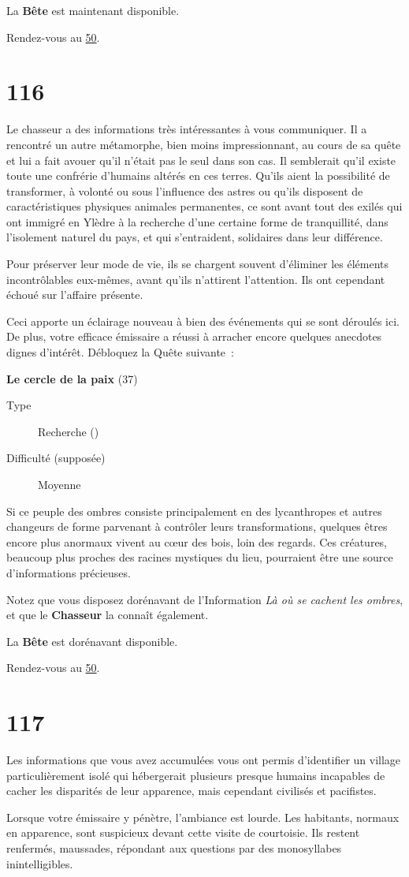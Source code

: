\documentclass{report}
\newcommand{\gsection}[1]{
    \section{#1}
    \label{section-#1}
}
\newcommand{\glink}[1]{\hyperref[section-#1]{#1}}
\newcommand{\quest}[5]{
    \begin{mdframed}[innertopmargin=0.5cm,innerbottommargin=0.5cm,leftmargin=0.5cm,rightmargin=0.5cm]
        \begin{center}
            \textbf{#1} (#2)
        \end{center}
        \begin{description}
            \item[Type] #3
            \item[Difficulté (supposée)] #4
        \end{description}
        #5
    \end{mdframed}
}
\newcommand{\hero}[1]{\textbf{#1}}
\begin{document}
La \hero{Bête} est maintenant disponible.

Rendez-vous au \glink{50}.

\gsection{116}

Le chasseur a des informations très intéressantes à vous communiquer. Il a rencontré un autre métamorphe, bien moins impressionnant, au cours de sa quête et lui a fait avouer qu'il n'était pas le seul dans son cas. Il semblerait qu'il existe toute une confrérie d'humains altérés en ces terres. Qu'ils aient la possibilité de transformer, à volonté ou sous l'influence des astres ou qu'ils disposent de caractéristiques physiques animales permanentes, ce sont avant tout des exilés qui ont immigré en Ylèdre à la recherche d'une certaine forme de tranquillité, dans l'isolement naturel du pays, et qui s'entraident, solidaires dans leur différence. 

Pour préserver leur mode de vie, ils se chargent souvent d'éliminer les éléments incontrôlables eux-mêmes, avant qu'ils n'attirent l'attention. Ils ont cependant échoué sur l'affaire présente. 

Ceci apporte un éclairage nouveau à bien des événements qui se sont déroulés ici. De plus, votre efficace émissaire a réussi à arracher encore quelques anecdotes dignes d'intérêt. Débloquez la Quête suivante : 

\quest{Le cercle de la paix}{37}{Recherche (\caduceus)}{Moyenne}{
Si ce peuple des ombres consiste principalement en des lycanthropes et autres changeurs de forme parvenant à contrôler leurs transformations, quelques êtres encore plus anormaux vivent au cœur des bois, loin des regards. Ces créatures, beaucoup plus proches des racines mystiques du lieu, pourraient être une source d'informations précieuses.
}

Notez que vous disposez dorénavant de l'Information \emph{Là où se cachent les ombres}, et que le \hero{Chasseur} la connaît également.

La \hero{Bête} est dorénavant disponible.

Rendez-vous au \glink{50}.

\gsection{117}

Les informations que vous avez accumulées vous ont permis d'identifier un village particulièrement isolé qui hébergerait plusieurs presque humains incapables de cacher les disparités de leur apparence, mais cependant civilisés et pacifistes.

Lorsque votre émissaire y pénètre, l'ambiance est lourde. Les habitants, normaux en apparence, sont suspicieux devant cette visite de courtoisie. Ils restent renfermés, maussades, répondant aux questions par des monosyllabes inintelligibles. 
\end{document}
